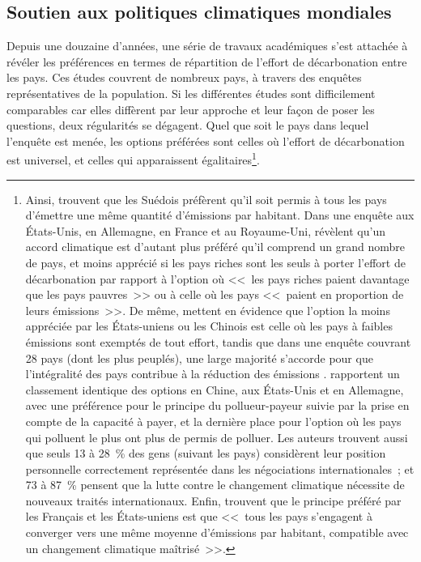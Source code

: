 \documentclass[a5paper,french,openany]{memoir}
\begin{document}
\subsection{Soutien aux politiques climatiques mondiales}

Depuis une douzaine d'années, une série de travaux académiques s'est attachée à révéler les préférences en termes de répartition de l'effort de décarbonation entre les pays. Ces études couvrent de nombreux pays, à travers des enquêtes représentatives de la population. Si les différentes études sont difficilement comparables car elles diffèrent par leur approche et leur façon de poser les questions, deux régularités se dégagent. Quel que soit le pays dans lequel l'enquête est menée, les options préférées sont celles où l'effort de décarbonation est universel, et celles qui apparaissent égalitaires\footnote{Ainsi, \citet{carlsson_is_2011} trouvent que les Suédois préfèrent qu'il soit permis à tous les pays d'émettre une même quantité d'émissions par habitant. Dans une enquête aux États-Unis, en Allemagne, en France et au Royaume-Uni, \citet{bechtel_mass_2013} révèlent qu'un accord climatique est d'autant plus préféré qu'il comprend un grand nombre de pays, %
et moins apprécié si les pays riches sont les seuls à porter l'effort de décarbonation par rapport à l'option où <<~les pays riches paient davantage que les pays pauvres~>> ou à celle où les pays <<~paient en proportion de leurs émissions~>>. De même, \citet{carlsson_fair_2013} mettent en évidence que l'option la moins appréciée par les États-uniens ou les Chinois est celle où les pays à faibles émissions sont exemptés de tout effort, tandis que dans une enquête couvrant 28 pays (dont les plus peuplés), une large majorité s'accorde pour que l'intégralité des pays contribue à la réduction des émissions \citep{dabla-norris_public_2023}. 
\citet{schleich_citizens_2016} rapportent un classement identique des options en Chine, aux États-Unis et en Allemagne, avec une préférence pour le principe du pollueur-payeur suivie par la prise en compte de la capacité à payer, et la dernière place pour l'option où les pays qui polluent le plus ont plus de permis de polluer. Les auteurs trouvent aussi que seuls 13 à 28~\% des gens (suivant les pays) considèrent leur position personnelle correctement représentée dans les négociations internationales~; et 73 à 87~\% pensent que la lutte contre le changement climatique nécessite de nouveaux traités internationaux. Enfin, \citet{meilland_international_2023} trouvent que le principe préféré par les Français et les États-uniens est que <<~tous les pays s'engagent à converger vers une même moyenne d'émissions par habitant, compatible avec un changement climatique maîtrisé~>>.}. %
\end{document}
